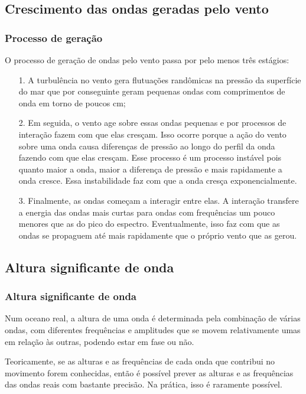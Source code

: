 \subsection{Crescimento das ondas geradas pelo vento}
\begin{frame}
\frametitle{Processo de geração}
  {\small O processo de geração de ondas pelo vento passa por pelo menos três}
          estágios:
  {\scriptsize
  \begin{itemize}[<+-| alert@+>]
    \item[1.] A turbulência no vento gera flutuações randômicas na pressão da
              superfície do mar que por conseguinte geram pequenas ondas com
              comprimentos de onda em torno de poucos cm;
    \item[2.] Em seguida, o vento age sobre essas ondas pequenas e por
              processos de interação fazem com que elas cresçam. Isso ocorre
              porque a ação do vento sobre uma onda causa diferenças de pressão
              ao longo do perfil da onda fazendo com que elas cresçam. Esse
              processo é um processo instável pois quanto maior a onda, maior a diferença de pressão e mais rapidamente a onda cresce. Essa instabilidade faz com que a onda cresça exponencialmente.
    \item[3.] Finalmente, as ondas começam a interagir entre elas. A interação
              transfere a energia das ondas mais curtas para ondas com
              frequências um pouco menores que as do pico do espectro.
              Eventualmente, isso faz com que as ondas se propaguem até mais
              rapidamente que o próprio vento que as gerou.
  \end{itemize}
  }
\end{frame}


\subsection{Altura significante de onda}
\begin{frame}
\frametitle{Altura significante de onda}
  {\small
  \begin{block}{}
    Num oceano real, a altura de uma onda é determinada pela combinação de
    várias ondas, com diferentes frequências e amplitudes que se movem
    relativamente umas em relação às outras, podendo estar em fase ou não.

    Teoricamente, se as alturas e as frequências de cada onda que contribui no
    movimento forem conhecidas, então é possível prever as alturas e as
    frequências das ondas reais com bastante precisão. Na prática, isso é
    raramente possível.
  \end{block}
  }
\end{frame}


